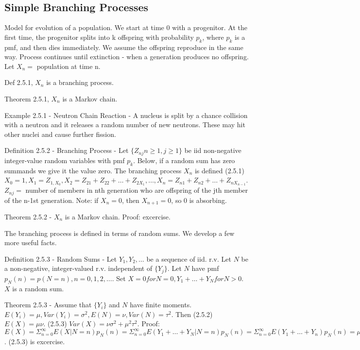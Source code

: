 \documentclass{article}
\begin{document}
\subsection{Simple Branching Processes}

Model for evolution of a population. We start at time 0 with a progenitor. At the first time, the progenitor splits into k offspring with probability $p_k$, where {$p_k$} is a pmf, and then dies immediately. We assume the offspring reproduce in the same way. Process continues until extinction - when a generation produces no offspring. Let $X_n = $ population at time n.

Def 2.5.1, $X_n$ is a branching process.

Theorem 2.5.1, $X_n$ is a Markov chain.

Example 2.5.1 - Neutron Chain Reaction - A nucleus is split by a chance collision with a neutron and it releases a random number of new neutrons. These may hit other nuclei and cause further fission.

Definition 2.5.2 - Branching Process - Let $\{Z_{nj} n \ge 1, j \ge 1\}$ be iid non-negative integer-value random variables with pmf ${p_k}$. Below, if a random sum has zero summands we give it the value zero. The branching process $X_n$ is defined (2.5.1) $X_0 = 1, X_1 = Z_{1, X_0}, X_2 = Z_{21} + Z_{22} + \dots + Z_{2X_1}, \dots, X_n = Z_{n1} + Z_{n2} + \dots + Z_{nX_{n-1}}$. $Z_{nj} = $ number of members in nth generation who are offspring of the jth member of the n-1st generation. Note: if $X_n = 0$, then $X_{n+1} = 0$, so 0 is absorbing.

Theorem 2.5.2 - $X_n$ is a Markov chain. Proof: excercise.

The branching process is defined in terms of random sums. We develop a few more useful facts.

Definition 2.5.3 - Random Sums - Let $Y_1, Y_2, \dots$ be a sequence of iid. r.v. Let $N$ be a non-negative, integer-valued r.v. independent of $\{Y_j\}$. Let $N$ have pmf $p_N(n) = p(N = n), n = 0, 1, 2, \dots$. Set $X = 0 for N=0, Y_1 + \dots + Y_N for N > 0$. $X$ is a random sum.

Theorem 2.5.3 - Assume that $\{Y_i\}$ and $N$ have finite moments. $E(Y_i) = \mu, Var(Y_i) = \sigma^2, E(N) = \nu, Var(N) = \tau^2$. Then (2.5.2) $E(X) = \mu \nu$. (2.5.3) $Var(X) = \nu \sigma^2 + \mu^2 \tau^2$. Proof: $E(X) = \Sigma_{n=0}^{\infty} E(X|N=n) p_N(n) = \Sigma_{n=0}^{\infty} E(Y_1 + \dots + Y_N|N=n)p_N(n) = \Sigma_{n=0}^{\infty}E(Y_1 + \dots + Y_n) p_N(n) = \mu \Sigma_{n=0}^{\infty}n p_N(n)$. (2.5.3) is excercise.
\end{document}
